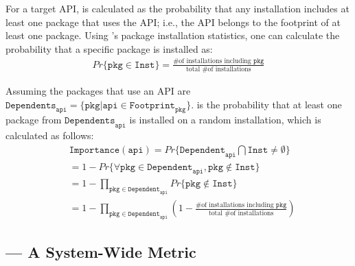 \noindent
For a target API, \usagemetric{} is calculated as the probability
that any installation includes
at least one package that uses the API;
i.e.,
the API belongs to the footprint of at least one package.
Using \osdist{}'s package installation statistics, one can calculate the
probability that a specific package is installed as:
\begin{align*}
Pr\{\mathtt{pkg} \in \mathtt{Inst}\} = \frac{\text{\# of installations including $\mathtt{pkg}$}}{\text{total \# of installations}}
\end{align*}

\noindent
Assuming the packages that use an API are  
$\mathtt{Dependents}_\mathtt{api} = \{\mathtt{pkg}|\mathtt{api} \in \mathtt{Footprint}_\mathtt{pkg}\}$.
\Usagemetric{} is the probability that at least one package
from $\mathtt{Dependents}_\mathtt{api}$ is installed on a random installation, which is calculated as follows:
\begin{align*}
&\mathtt{Importance}(\mathtt{api}) = Pr\{\mathtt{Dependent}_\mathtt{api} \bigcap \mathtt{Inst} \neq \emptyset\} \\
&= 1 - Pr\{\forall \mathtt{pkg} \in \mathtt{Dependent}_\mathtt{api}, \mathtt{pkg} \notin \mathtt{Inst}\} \\
&= 1 - \prod_{\mathtt{pkg} \in \mathtt{Dependent}_\mathtt{api}} Pr\{\mathtt{pkg} \notin \mathtt{Inst}\} \\
&= 1 - \prod_{\mathtt{pkg} \in \mathtt{Dependent}_\mathtt{api}} (1 - \frac{\text{\# of installations including $\mathtt{pkg}$}}{\text{total \# of installations}})
\end{align*}

\subsection{{\bf \CompatMetric{}} --- A System-Wide Metric}
\label{sec:defs:compatmetric}



